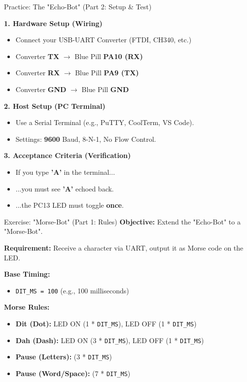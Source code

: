 \documentclass{beamer}
\begin{document}
\begin{frame}{Practice: The "Echo-Bot" (Part 2: Setup \& Test)}
	
	\textbf{1. Hardware Setup (Wiring)}
	\begin{itemize}
		\item Connect your USB-UART Converter (FTDI, CH340, etc.)
		\item Converter \textbf{TX} $\rightarrow$ Blue Pill \textbf{PA10 (RX)}
		\item Converter \textbf{RX} $\rightarrow$ Blue Pill \textbf{PA9 (TX)}
		\item Converter \textbf{GND} $\rightarrow$ Blue Pill \textbf{GND}
	\end{itemize}
	
	
	
	\medskip
	\textbf{2. Host Setup (PC Terminal)}
	\begin{itemize}
		\item Use a Serial Terminal (e.g., PuTTY, CoolTerm, VS Code).
		\item Settings: \textbf{9600} Baud, 8-N-1, No Flow Control.
	\end{itemize}
	
	\medskip
	\textbf{3. Acceptance Criteria (Verification)}
	\begin{itemize}
		\item If you type \textbf{'A'} in the terminal...
		\item ...you must see \textbf{'A'} echoed back.
		\item ...the PC13 LED must toggle \textbf{once}.
	\end{itemize}
\end{frame}

\begin{frame}{Exercise: "Morse-Bot" (Part 1: Rules)}
	\textbf{Objective:} Extend the "Echo-Bot" to a "Morse-Bot".
	
	\medskip
	\textbf{Requirement:} Receive a character via UART, output it as Morse code on the LED.
	
	\medskip
	\textbf{Base Timing:}
	\begin{itemize}
		\item \texttt{DIT\_MS = 100} (e.g., 100 milliseconds)
	\end{itemize}
	
	\textbf{Morse Rules:}
	\begin{itemize}
		\item \textbf{Dit (Dot):} LED ON (1 * \texttt{DIT\_MS}), LED OFF (1 * \texttt{DIT\_MS})
		\item \textbf{Dah (Dash):} LED ON (3 * \texttt{DIT\_MS}), LED OFF (1 * \texttt{DIT\_MS})
		\item \textbf{Pause (Letters):} (3 * \texttt{DIT\_MS})
		\item \textbf{Pause (Word/Space):} (7 * \texttt{DIT\_MS})
	\end{itemize}
\end{frame}
\end{document}

